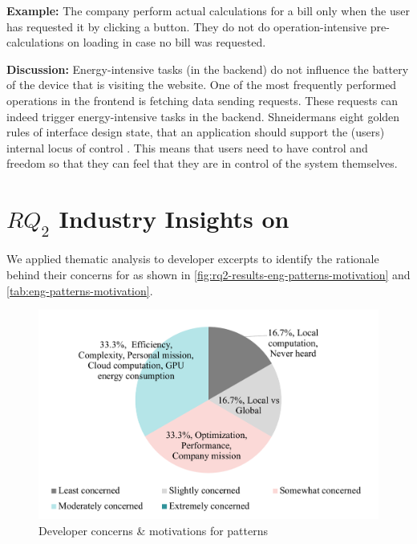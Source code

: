 \textbf{Example:} The company perform actual calculations for a bill only when the user has requested it by clicking a button. They do not do operation-intensive pre-calculations on loading in case no bill was requested.



\textbf{Discussion:} Energy-intensive tasks (in the backend) do not influence the battery of the device that is visiting the website. One of the most frequently performed operations in the frontend is fetching data \ie sending requests. These requests can indeed trigger energy-intensive tasks in the backend. Shneidermans eight golden rules of interface design state, that an application should support the (users) internal locus of control \cite{shneidermans-eight-golden-rules}. This means that users need to have control and freedom so that they can feel that they are in control of the system themselves.



\section{\texorpdfstring{$RQ_2$}: Industry Insights on \EPS} 
We applied thematic analysis to developer excerpts to identify the rationale behind their concerns for \eps as shown in \autoref{fig:rq2-results-eng-patterns-motivation} and \autoref{tab:eng-patterns-motivation}.

\begin{figure}[ht]
    \includegraphics[width=\linewidth]{RQ2/Img/rq2-results-eng-patterns-motivation.pdf}
	\caption{Developer concerns \& motivations for patterns}
	\label{fig:rq2-results-eng-patterns-motivation}	
\end{figure}


